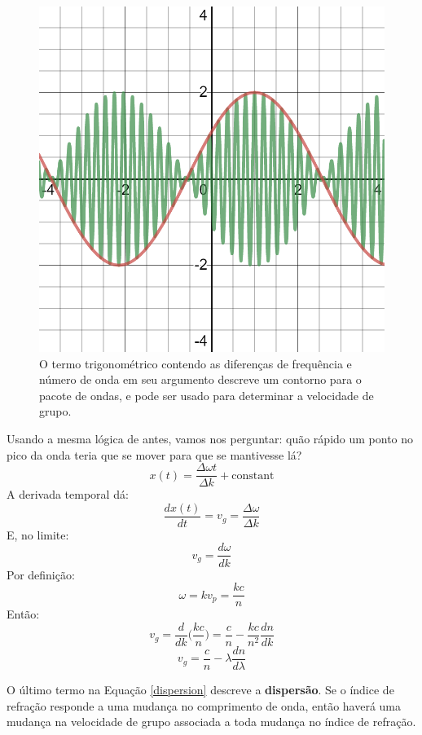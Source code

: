 \documentclass[12pt,a4paper]{report}
\begin{document}
\begin{figure}[H]
    \centering
    \includegraphics[width=0.5\linewidth]{envelope.png}
    \caption{O termo trigonométrico contendo as diferenças de frequência e número de onda em seu argumento descreve um contorno para o pacote de ondas, e pode ser usado para determinar a velocidade de grupo.}
    \label{envelope}
\end{figure}

Usando a mesma lógica de antes, vamos nos perguntar: quão rápido um ponto no pico da onda teria que se mover para que se mantivesse lá?
\begin{equation*}
    x(t)=\frac{\Delta\omega t}{\Delta k}+\text{constant}
\end{equation*}
A derivada temporal dá:
\begin{equation*}
    \frac{dx(t)}{dt}=v_g=\frac{\Delta\omega}{\Delta k}
\end{equation*}
E, no limite:
\begin{equation*}
    v_g=\frac{d\omega}{dk}
\end{equation*}
Por definição:
\begin{equation}
    \omega=kv_p=\frac{kc}{n}
\end{equation}
Então:
\begin{equation*}
    v_g=\frac{d}{dk}\Biggl(\frac{kc}{n}\Biggr)=\frac{c}{n}-\frac{kc}{n^2}\frac{dn}{dk}
\end{equation*}
\begin{equation*}
    \boxed{v_g=\frac{c}{n}-\lambda\frac{dn}{d\lambda}}
    \label{dispersion}
\end{equation*}

O último termo na Equação \ref{dispersion} descreve a \textbf{dispersão}. Se o índice de refração responde a uma mudança no comprimento de onda, então haverá uma mudança na velocidade de grupo associada a toda mudança no índice de refração.
\end{document}
